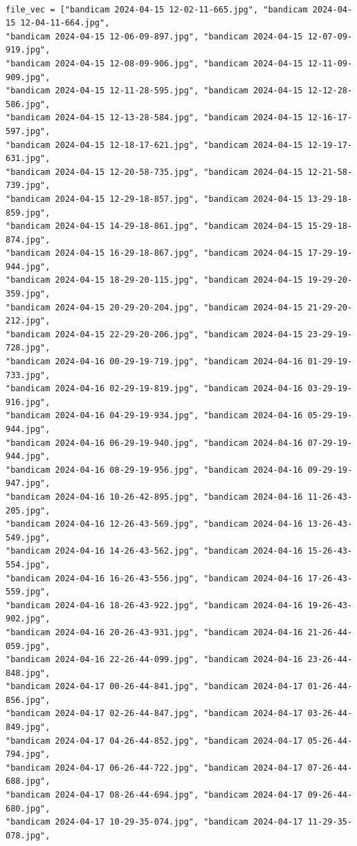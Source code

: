 \documentclass[11pt]{article}
\begin{document}
\begin{verbatim}

file_vec = ["bandicam 2024-04-15 12-02-11-665.jpg", "bandicam 2024-04-15 12-04-11-664.jpg",
"bandicam 2024-04-15 12-06-09-897.jpg", "bandicam 2024-04-15 12-07-09-919.jpg",
"bandicam 2024-04-15 12-08-09-906.jpg", "bandicam 2024-04-15 12-11-09-909.jpg",
"bandicam 2024-04-15 12-11-28-595.jpg", "bandicam 2024-04-15 12-12-28-586.jpg",
"bandicam 2024-04-15 12-13-28-584.jpg", "bandicam 2024-04-15 12-16-17-597.jpg",
"bandicam 2024-04-15 12-18-17-621.jpg", "bandicam 2024-04-15 12-19-17-631.jpg",
"bandicam 2024-04-15 12-20-58-735.jpg", "bandicam 2024-04-15 12-21-58-739.jpg",
"bandicam 2024-04-15 12-29-18-857.jpg", "bandicam 2024-04-15 13-29-18-859.jpg",
"bandicam 2024-04-15 14-29-18-861.jpg", "bandicam 2024-04-15 15-29-18-874.jpg",
"bandicam 2024-04-15 16-29-18-867.jpg", "bandicam 2024-04-15 17-29-19-944.jpg",
"bandicam 2024-04-15 18-29-20-115.jpg", "bandicam 2024-04-15 19-29-20-359.jpg",
"bandicam 2024-04-15 20-29-20-204.jpg", "bandicam 2024-04-15 21-29-20-212.jpg",
"bandicam 2024-04-15 22-29-20-206.jpg", "bandicam 2024-04-15 23-29-19-728.jpg",
"bandicam 2024-04-16 00-29-19-719.jpg", "bandicam 2024-04-16 01-29-19-733.jpg",
"bandicam 2024-04-16 02-29-19-819.jpg", "bandicam 2024-04-16 03-29-19-916.jpg",
"bandicam 2024-04-16 04-29-19-934.jpg", "bandicam 2024-04-16 05-29-19-944.jpg",
"bandicam 2024-04-16 06-29-19-940.jpg", "bandicam 2024-04-16 07-29-19-944.jpg",
"bandicam 2024-04-16 08-29-19-956.jpg", "bandicam 2024-04-16 09-29-19-947.jpg",
"bandicam 2024-04-16 10-26-42-895.jpg", "bandicam 2024-04-16 11-26-43-205.jpg",
"bandicam 2024-04-16 12-26-43-569.jpg", "bandicam 2024-04-16 13-26-43-549.jpg",
"bandicam 2024-04-16 14-26-43-562.jpg", "bandicam 2024-04-16 15-26-43-554.jpg",
"bandicam 2024-04-16 16-26-43-556.jpg", "bandicam 2024-04-16 17-26-43-559.jpg",
"bandicam 2024-04-16 18-26-43-922.jpg", "bandicam 2024-04-16 19-26-43-902.jpg",
"bandicam 2024-04-16 20-26-43-931.jpg", "bandicam 2024-04-16 21-26-44-059.jpg",
"bandicam 2024-04-16 22-26-44-099.jpg", "bandicam 2024-04-16 23-26-44-848.jpg",
"bandicam 2024-04-17 00-26-44-841.jpg", "bandicam 2024-04-17 01-26-44-856.jpg",
"bandicam 2024-04-17 02-26-44-847.jpg", "bandicam 2024-04-17 03-26-44-849.jpg",
"bandicam 2024-04-17 04-26-44-852.jpg", "bandicam 2024-04-17 05-26-44-794.jpg",
"bandicam 2024-04-17 06-26-44-722.jpg", "bandicam 2024-04-17 07-26-44-688.jpg",
"bandicam 2024-04-17 08-26-44-694.jpg", "bandicam 2024-04-17 09-26-44-680.jpg",
"bandicam 2024-04-17 10-29-35-074.jpg", "bandicam 2024-04-17 11-29-35-078.jpg",

\end{verbatim}
\end{document}
